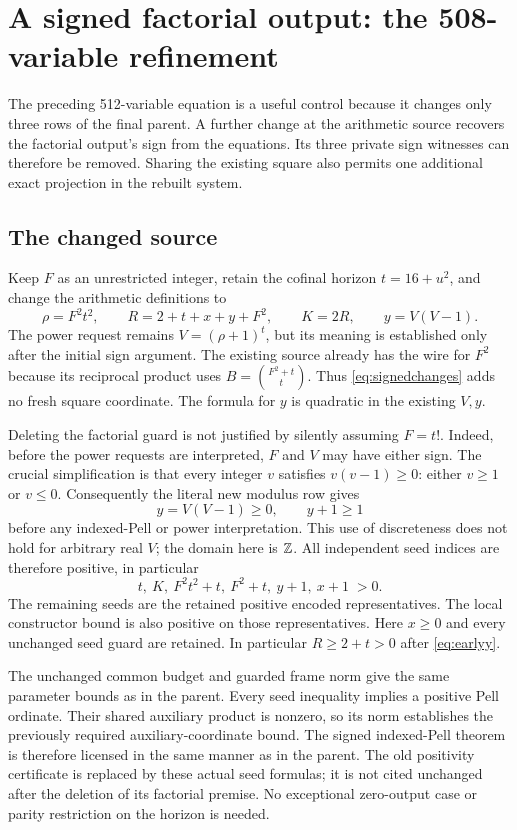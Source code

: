 \section{A signed factorial output: the 508-variable refinement}
\label{sec:508}

The preceding 512-variable equation is a useful control because it changes
only three rows of the final parent. A further change at the arithmetic
source recovers the factorial output's sign from the equations. Its three
private sign witnesses can therefore be removed. Sharing the existing square
also permits one additional exact projection in the rebuilt system.

\subsection{The changed source}
Keep $F$ as an unrestricted integer, retain the cofinal horizon
$t=16+u^2$, and change the arithmetic definitions to
\[
 \rho=F^2t^2,\qquad
 R=2+t+x+y+F^2,\qquad K=2R,\qquad
 \boxed{y=V(V-1).}
 \tag{12}\label{eq:signedchanges}
\]
The power request remains $V=(\rho+1)^t$, but its meaning is established
only after the initial sign argument. The existing source already has the
wire for $F^2$ because its reciprocal product uses
$B=\binom{F^2+t}{t}$. Thus \eqref{eq:signedchanges} adds no fresh square
coordinate. The formula for $y$ is quadratic in the existing $V,y$.

Deleting the factorial guard is not justified by silently assuming $F=t!$.
Indeed, before the power requests are interpreted, $F$ and $V$ may have
either sign. The crucial simplification is that every integer $v$ satisfies
$v(v-1)\ge0$: either $v\ge1$ or $v\le0$. Consequently the literal new
modulus row gives
\[
 y=V(V-1)\ge0,\qquad y+1\ge1
 \tag{13}\label{eq:consecutivepositive}
\]
before any indexed-Pell or power interpretation. This use of discreteness
does not hold for arbitrary real $V$; the domain here is $\mathbb Z$.
All independent seed indices are therefore positive, in particular
\[
 t,\ K,\ F^2t^2+t,\ F^2+t,\ y+1,\ x+1\;>0.
 \tag{14}\label{eq:earlyy}
\]
The remaining seeds are the retained positive encoded representatives.
The local constructor bound is also positive on those
representatives. Here $x\ge0$ and every unchanged seed guard are retained.
In particular $R\ge2+t>0$ after \eqref{eq:earlyy}.

The unchanged common budget and guarded frame norm give the same parameter
bounds as in the parent. Every seed inequality implies a positive Pell ordinate. Their shared
auxiliary product is nonzero, so its norm establishes the previously
required auxiliary-coordinate bound. The signed indexed-Pell theorem is
therefore licensed in the same manner as in the parent. The old positivity
certificate is replaced by these actual seed formulas; it is not cited
unchanged after the deletion of its factorial premise. No exceptional
zero-output case or parity restriction on the horizon is needed.

